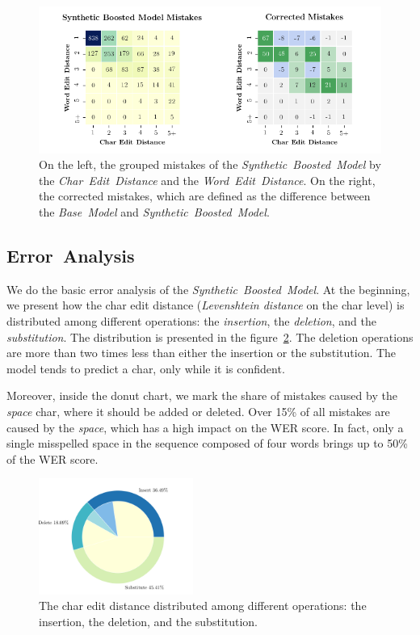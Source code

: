 \begin{figure}[h]
    \centering
    \includegraphics[width=1\textwidth]{figures/evaluation-improvements.png}
    \caption{
On the left, the grouped mistakes of the \textit{Synthetic~Boosted~Model} by
the \textit{Char~Edit~Distance} and the \textit{Word~Edit~Distance}.
On the right, the corrected mistakes, which are defined as the difference between
the \textit{Base~Model} and \textit{Synthetic~Boosted~Model}.
}
\label{fig:evaluation-improvements}
\end{figure}


\subsection*{Error~Analysis}

We do the basic error analysis of the \textit{Synthetic~Boosted~Model}.
At the beginning, we present how the char edit distance (\textit{Levenshtein distance} on the char level)
is distributed among different operations: the \textit{insertion}, the \textit{deletion}, and the \textit{substitution}.
The distribution is presented in the figure~\ref{fig:evaluation-donut}.
The deletion operations are more than two times less than either the insertion or the substitution.
The model tends to predict a char, only while it is confident.

Moreover, inside the donut chart, we mark the share of mistakes caused by the \textit{space} char, where
it should be added or deleted.
Over 15\% of all mistakes are caused by the \textit{space}, which has a high impact on the WER score.
In fact, only a single misspelled space in the sequence composed of four words brings up to 50\% of the WER score.

\begin{figure}[h]
    \centering
    \includegraphics[width=0.45\textwidth]{figures/evaluation-donut.png}
    \caption{
The char edit distance distributed among different operations: the insertion, the deletion, and the substitution.
}
    \label{fig:evaluation-donut}
\end{figure}

